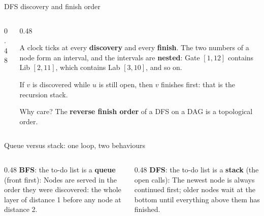 \documentclass[aspectratio=169,10pt]{beamer}
\begin{document}
\begin{frame}{DFS discovery and finish order}
\begin{columns}[T]
\begin{column}{0.48\textwidth}
\end{column}
\begin{column}{0.48\textwidth}
\vspace{1mm}
{\footnotesize
A clock ticks at every \textbf{discovery} and every \textbf{finish}. The two numbers of a node form an interval, and the intervals are \textbf{nested}: Gate $[1,12]$ contains Lib $[2,11]$, which contains Lab $[3,10]$, and so on.

\vspace{1mm}
If $v$ is discovered while $u$ is still open, then $v$ finishes first: that is the recursion stack.

\vspace{1mm}
Why care? The \textbf{reverse finish order} of a DFS on a DAG is a topological order.}
\end{column}
\end{columns}
\end{frame}

\begin{frame}{Queue versus stack: one loop, two behaviours}
\begin{columns}[T]
\begin{column}{0.48\textwidth}
{\small \textbf{BFS}: the to-do list is a \textbf{queue} (front first):}
\vspace{2mm}
{\small Nodes are served in the order they were discovered: the whole layer of distance 1 before any node at distance 2.}
\end{column}
\begin{column}{0.48\textwidth}
{\small \textbf{DFS}: the to-do list is a \textbf{stack} (the open calls):}
\vspace{2mm}
{\small The newest node is always continued first; older nodes wait at the bottom until everything above them has finished.}
\end{column}
\end{columns}
\end{frame}
\end{document}
